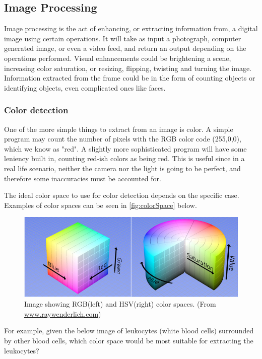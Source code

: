 			\subsection{Image Processing}
			Image processing is the act of enhancing, or extracting information from, a digital image using certain operations. It will take as input a photograph, computer generated image, or even a video feed, and return an output depending on the operations performed. Visual enhancements could be brightening a scene, increasing color saturation, or resizing, flipping, twisting and turning the image. Information extracted from the frame could be  in the form of counting objects or identifying objects, even complicated ones like faces. 
			
			\subsubsection{Color detection}
			One of the more simple things to extract from an image is color. A simple program may count the number of pixels with the RGB color code (255,0,0), which we know as "red". A slightly more sophisticated program will have some leniency built in, counting red-ish colors as being red. This is useful since in a real life scenario, neither the camera nor the light is going to be perfect, and therefore some inaccuracies must be accounted for. 
			
			The ideal color space to use for color detection depends on the specific case. Examples of color spaces can be seen in \autoref{fig:colorSpace} below.
			
			\begin{figure}[H]
				\centering
				\includegraphics[width=0.9\linewidth]{figure/Analysis/colorspaces.jpg}
				\caption{Image showing RGB(left) and HSV(right) color spaces. (From \href{https://www.raywenderlich.com/69855/image-processing-in-ios-part-1-raw-bitmap-modification}{www.raywenderlich.com})}
				\label{fig:colorSpace}
			\end{figure}
		
			For example, given the below image of leukocytes (white blood cells) surrounded by other blood cells, which color space would be most suitable for extracting the leukocytes?
			
